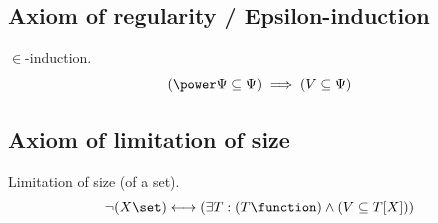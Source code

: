 \subsection{Axiom of regularity / Epsilon-induction}
\begin{axiom} 
\label{axn:epsilon induction}
$\in$-induction. %
\[
(\power\Psi\subseteq\Psi)\implies(V\subseteq\Psi)
\]
\end{axiom}


\subsection{Axiom of limitation of size}
\begin{axiom}
\label{axm:limitation of size}
Limitation of size (of a set).
\[
\neg(X\set) \longleftrightarrow (\exists T: (T\function)\land (V\subseteq T[X]))
\]
\end{axiom}

